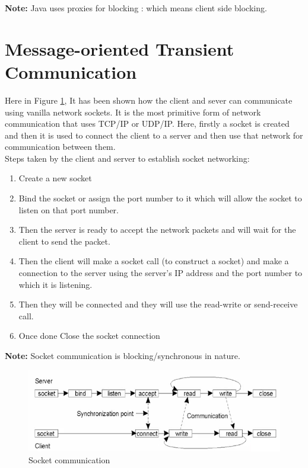 \documentclass[twoside]{article}
\begin{document}
\textbf{Note:} Java uses proxies for blocking : which means client side blocking.

\section{Message-oriented Transient Communication}

Here in Figure \ref{socket_communication}, It has been shown how the client and sever can communicate using vanilla network sockets. It is the most primitive form of network communication that uses TCP/IP or UDP/IP. Here, firstly a socket is created and then it is used to connect the client to a server and then use that network for communication between them. \\
Steps taken by the client and server to establish socket networking:
\begin{enumerate}
\item Create a new socket
\item Bind the socket or assign the port number to it which will allow the socket to listen on that port number.
\item Then the server is ready to accept the network packets and will wait for the client to send the packet.
\item Then the client will make a socket call (to construct a socket) and make a connection to the server using the server's IP address and the port number to which it is listening.
\item Then they will be connected and they will use the read-write or send-receive call.
\item Once done Close the socket connection
\end{enumerate}

\textbf{Note:} Socket communication is blocking/synchronous in nature.

\begin{figure}[h]
	\begin{center}
		\includegraphics[scale=0.7]{images/sockets}
		\caption{Socket communication}
		\label{socket_communication}
	\end{center}
\end{figure}
\end{document}
